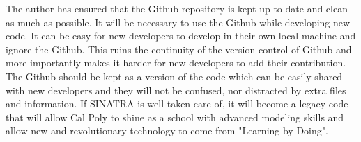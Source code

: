 \indent The author has ensured that the Github repository is kept up to date and clean as much as possible. It will be necessary to use the Github while developing new code. It can be easy for new developers to develop in their own local machine and ignore the Github. This ruins the continuity of the version control of Github and more importantly makes it harder for new developers to add their contribution. The Github should be kept as a version of the code which can be easily shared with new developers and they will not be confused, nor distracted by extra files and information. If SINATRA is well taken care of, it will become a legacy code that will allow Cal Poly to shine as a school with advanced modeling skills and allow new and revolutionary technology to come from "Learning by Doing".




